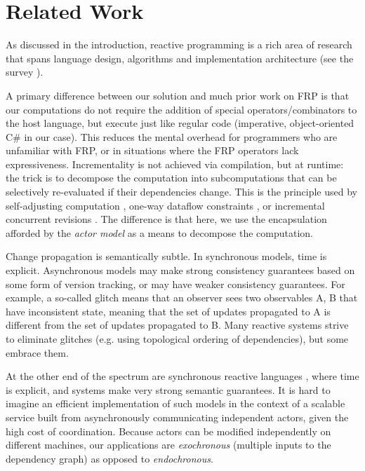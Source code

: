 \section{Related Work}

As discussed in the introduction, reactive programming is a rich area of research that spans language design, algorithms and implementation architecture (see the survey \cite{reactivesurvey}).

A primary difference between our solution and much prior work on FRP \cite{frp-firstprinciples,frp-animation,frp-frtime,frp-arrows,elm,afp,flapjax,frappe} is that our computations do not require the addition of special operators/combinators to the host language, but execute just like regular code (imperative, object-oriented C\# in our case). This reduces the mental overhead for programmers who are unfamiliar with FRP, or in situations where the FRP operators lack expressiveness. Incrementality is not achieved via compilation, but at runtime: the trick is to decompose the computation into subcomputations that can be selectively re-evaluated if their dependencies change. This is the principle used by self-adjusting computation \cite{acar-ahmed-blume-POPL08,Acar:SelfAdjustingExperiments,Acar:SelfAdjustingOverview,Hammer:Ceal09,Acar:SelfAdjustingTypes10}, one-way dataflow constraints \cite{camil}, or incremental concurrent revisions \cite{burckhardt-leijen-yi-sadowski-ball-OOPSLA11}. The difference is that here, we use the encapsulation afforded by the \emph{actor model} as a means to decompose the computation.

Change propagation is semantically subtle. In synchronous models, time is explicit. Asynchronous models may make strong consistency guarantees based on some form of version tracking, or may have weaker consistency guarantees. For example, a so-called glitch means that an observer sees two observables A, B that have inconsistent state, meaning that the set of updates propagated to A is different from the set of updates propagated to B. Many reactive systems strive to eliminate glitches (e.g. using topological ordering of dependencies), but some embrace them.

At the other end of the spectrum are synchronous reactive languages \cite{lustre,signal,esterel,syncdataflow}, where time is explicit, and systems make very strong semantic guarantees. It is hard to imagine an efficient implementation of such models in the context of a scalable service built from asynchronously communicating independent actors, given the high cost of coordination. Because actors can be modified independently on different machines, our applications are \emph{exochronous} (multiple inputs to the dependency graph) as opposed to \emph{endochronous}.  

